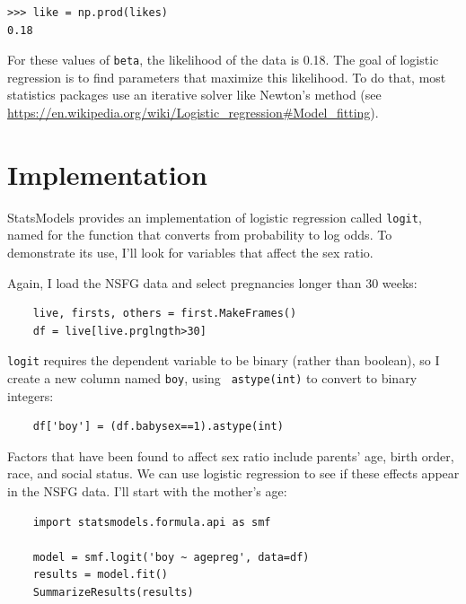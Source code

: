 \documentclass[12pt]{book}
\theoremstyle{exercise}
\begin{document}
\begin{verbatim}
>>> like = np.prod(likes)
0.18
\end{verbatim}

For these values of {\tt beta}, the likelihood of the data is 0.18.
The goal of logistic regression is to find parameters that maximize
this likelihood.  To do that, most statistics packages use an
iterative solver like Newton's method (see
\url{https://en.wikipedia.org/wiki/Logistic_regression#Model_fitting}).%
%


\section{Implementation}%
\label{implementation}

StatsModels provides an implementation of logistic regression
called {\tt logit}, named for the function that converts from
probability to log odds.  To demonstrate its use, I'll look for
variables that affect the sex ratio.%
%
%

Again, I load the NSFG data and select pregnancies longer than
30 weeks:

\begin{verbatim}
    live, firsts, others = first.MakeFrames()
    df = live[live.prglngth>30]
\end{verbatim}

{\tt logit} requires the dependent variable to be binary (rather than
boolean), so I create a new column named {\tt boy}, using {\tt
  astype(int)} to convert to binary integers:%
%
%

\begin{verbatim}
    df['boy'] = (df.babysex==1).astype(int)
\end{verbatim}

Factors that have been found to affect sex ratio include parents'
age, birth order, race, and social status.  We can use logistic
regression to see if these effects appear in the NSFG data.  I'll
start with the mother's age:%
%

\begin{verbatim}
    import statsmodels.formula.api as smf

    model = smf.logit('boy ~ agepreg', data=df)
    results = model.fit()
    SummarizeResults(results)
\end{verbatim}
\end{document}
